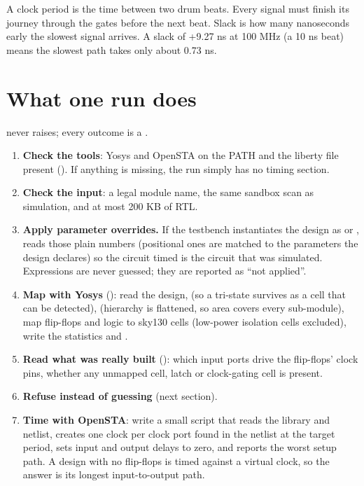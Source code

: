 \begin{analogy}
A clock period is the time between two drum beats. Every signal must finish its journey through the gates before the next beat. Slack is how many nanoseconds early the slowest signal arrives. A slack of +9.27 ns at 100 MHz (a 10 ns beat) means the slowest path takes only about 0.73 ns.
\end{analogy}

\section{What one run does}

 never raises; every outcome is a .
\begin{enumerate}
  \item \textbf{Check the tools}: Yosys and OpenSTA on the PATH and the liberty file present (). If anything is missing, the run simply has no timing section.
  \item \textbf{Check the input}: a legal module name, the same sandbox scan as simulation, and at most 200 KB of RTL.
  \item \textbf{Apply parameter overrides.} If the testbench instantiates the design as  or ,  reads those plain numbers (positional ones are matched to the parameters the design declares) so the circuit timed is the circuit that was simulated. Expressions are never guessed; they are reported as ``not applied''.
  \item \textbf{Map with Yosys} (): read the design,  (so a tri-state survives as a cell that can be detected),  (hierarchy is flattened, so area covers every sub-module), map flip-flops and logic to sky130 cells (low-power isolation cells excluded), write the statistics and .
  \item \textbf{Read what was really built} (): which input ports drive the flip-flops' clock pins, whether any unmapped cell, latch or clock-gating cell is present.
  \item \textbf{Refuse instead of guessing} (next section).
  \item \textbf{Time with OpenSTA}: write a small script that reads the library and netlist, creates one clock per clock port found in the netlist at the target period, sets input and output delays to zero, and reports the worst setup path. A design with no flip-flops is timed against a virtual clock, so the answer is its longest input-to-output path.

\end{enumerate}
